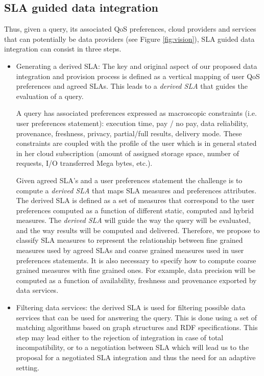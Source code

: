 \subsection{SLA guided data integration}
Thus, given a query, its associated QoS preferences, cloud providers  and  services that can potentially be data providers (see Figure \ref{fig:vision}),  SLA guided data  integration can consist in three steps.  
\begin{itemize}
\item Generating a derived SLA:  
The key and original aspect of   our proposed data integration and provision process is  defined as a vertical mapping of user QoS preferences and agreed SLAs. This  leads to a {\em derived SLA} that guides the evaluation of a query. 

A query has associated preferences  expressed as macroscopic constraints (i.e. user preferences statement): execution time, pay / no pay, data reliability, provenance, freshness, privacy, partial/full results, delivery mode. These constraints are coupled with the profile of the user which is in general stated in her cloud subscription (amount of assigned storage space, number of requests, I/O transferred Mega bytes, etc.). 

Given agreed SLA's and a user preferences statement the challenge is to compute a  {\em derived SLA} that  maps SLA measures and preferences attributes.  The derived SLA is defined as a set of measures that correspond to the user preferences computed as a function of different static, computed and hybrid measures. The {\em derived SLA}  will guide the way the query will be evaluated, and the way results will be computed and delivered.
Therefore, we propose to classify SLA measures to represent the relationship between fine grained measures used by agreed SLAs and coarse grained measures used in user preferences statements. It is also necessary to specify how to compute coarse grained measures with fine grained ones. For example, data precision will be computed as a function of availability, freshness and provenance exported by data services. 

  
\item Filtering data services: the derived SLA  is used for filtering possible data services that can be used for answering the query. This is done using a set of matching algorithms based on  graph structures and RDF specifications. This step may lead either to the rejection of integration in case of total incompatibility, or to a negotiation between SLA which will lead us to the proposal for a negotiated SLA integration and thus the need for an adaptive setting.



\end{itemize}
